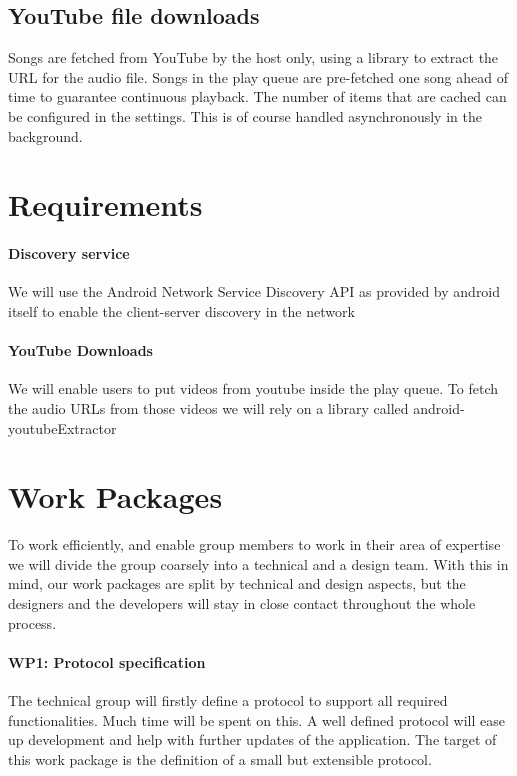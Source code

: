 \documentclass{report}
\begin{document}
\subsection{YouTube file downloads}
Songs are fetched from YouTube by the host only, using a library \cite{youtubeExtractor}
to extract the URL for the audio file. Songs in the play queue are pre-fetched
one song ahead of time to guarantee continuous playback. The number of items that 
are cached can be configured in the settings. This is of course handled asynchronously in
the background.

\section{Requirements}

	\paragraph{Discovery service}
	We will use the Android Network Service Discovery API \cite{nsd} as provided by android itself
	to enable the client-server discovery in the network
	
	\paragraph{YouTube Downloads}
	We will enable users to put videos from youtube inside the play queue. To fetch the audio
	URLs from those videos we will rely on a library called android-youtubeExtractor \cite{youtubeExtractor}

\section{Work Packages}
To work efficiently, and enable group members to work in their area of expertise
we will divide the group coarsely into a technical and a design team.
With this in mind, our work packages are split by technical and design aspects, but 
the designers and the developers will stay in close contact throughout the whole process.

\paragraph{WP1: Protocol specification}
The technical group will firstly define a protocol to support all required functionalities.
Much time will be spent on this. A well defined protocol will ease up development and
help with further updates of the application. The target of this work package is the
definition of a small but extensible protocol.
\end{document}
